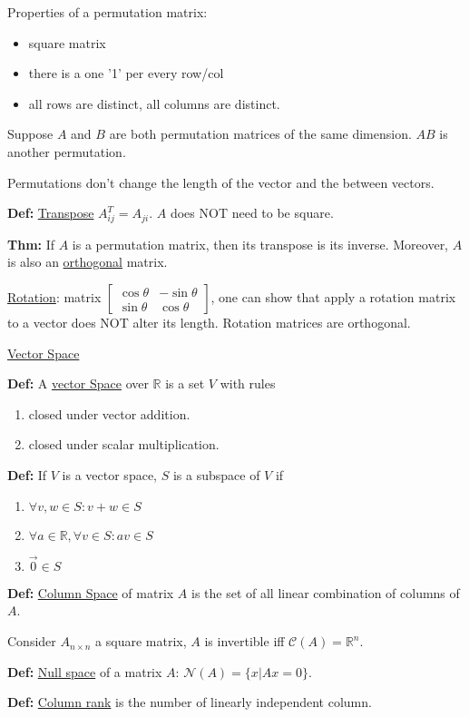 \documentclass{report}
\begin{document}
Properties of a permutation matrix:
\begin{itemize}
    \item square matrix
    \item there is a one '1' per every row/col
    \item all rows are distinct, all columns are distinct.
\end{itemize}

Suppose $A$ and $B$ are both permutation matrices of the same dimension.
$AB$ is another permutation.

Permutations don't change the length of the vector and
the between vectors.

\textbf{Def:} \underline{Transpose} $A^{T}_{ij} = A_{ji}$. $A$ does NOT
need to be square.

\textbf{Thm:} If $A$ is a permutation matrix, then its
transpose is its inverse. Moreover, $A$ is also an \underline{orthogonal}
matrix.

\vspace{2mm}

\underline{Rotation}: matrix
$\begin{bmatrix}
        \cos \theta & -\sin \theta \\
        \sin \theta & \cos \theta
    \end{bmatrix}$,
one can show that apply a rotation matrix to a vector does NOT
alter its length. Rotation matrices are orthogonal.

\vspace{5mm}

\underline{Vector Space}

\textbf{Def:} A \underline{vector Space} over $\mathbb{R}$ is a set $V$
with rules
\begin{enumerate}
    \item closed under vector addition.
    \item closed under scalar multiplication.
\end{enumerate}

\textbf{Def:} If $V$ is a vector space, $S$ is a subspace of $V$ if
\begin{enumerate}
    \item $\forall v,w \in S: v + w \in S$
    \item $\forall a \in \mathbb{R}, \forall v \in S: av \in S$
    \item $\vec{0} \in S$
\end{enumerate}

\textbf{Def:} \underline{Column Space} of matrix $A$ is the set of all linear
combination of columns of $A$.

Consider $A_{n \times n}$ a square matrix, $A$ is invertible iff
$\mathcal{C}(A) = \mathbb{R}^{n}$.

\textbf{Def:} \underline{Null space} of a matrix $A$:
$\mathcal{N}(A) = \{x | Ax = 0\}$.

\textbf{Def:} \underline{Column rank} is the number of linearly independent
column.
\end{document}
